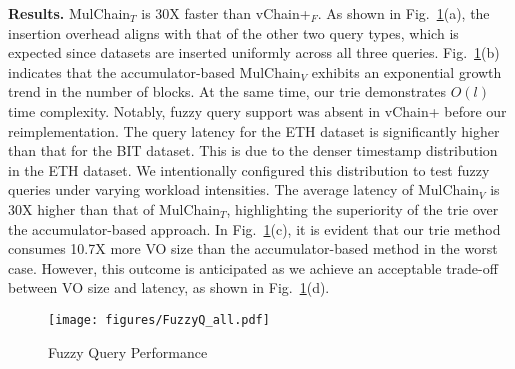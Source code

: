 \noindent
\textbf{Results.}
MulChain$_T$ is 30X faster than vChain+$_F$.
As shown in Fig.~\ref{fig:Fuzzy Query Performance}(a), the insertion overhead aligns with that of the other two query types, which is expected since datasets are inserted uniformly across all three queries. Fig.~\ref{fig:Fuzzy Query Performance}(b) indicates that the accumulator-based MulChain$_V$ exhibits an exponential growth trend in the number of blocks. At the same time, our trie demonstrates \( O(l) \) time complexity. Notably, fuzzy query support was absent in vChain+ before our reimplementation. The query latency for the ETH dataset is significantly higher than that for the BIT dataset. This is due to the denser timestamp distribution in the ETH dataset. We intentionally configured this distribution to test fuzzy queries under varying workload intensities. The average latency of MulChain$_V$ is 30X higher than that of MulChain$_T$, highlighting the superiority of the trie over the accumulator-based approach. In Fig.~\ref{fig:Fuzzy Query Performance}(c), it is evident that our trie method consumes 10.7X more VO size than the accumulator-based method in the worst case. However, this outcome is anticipated as we achieve an acceptable trade-off between VO size and latency, as shown in Fig.~\ref{fig:Fuzzy Query Performance}(d).


\begin{figure}[htbp]
    \centering
    \texttt{[image: figures/FuzzyQ\_all.pdf]}
    \caption{Fuzzy Query Performance}
    \label{fig:Fuzzy Query Performance}
\end{figure}

